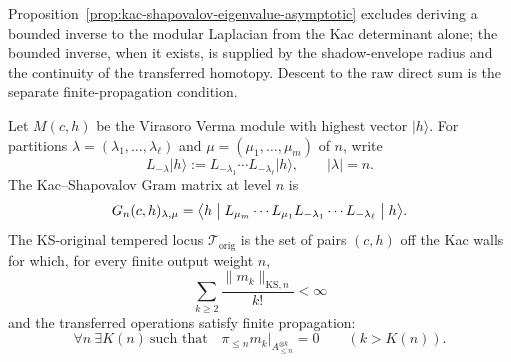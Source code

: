 \begin{remark}
\label{rem:why-no-naive-geometric-series}
Proposition~\ref{prop:kac-shapovalov-eigenvalue-asymptotic} excludes
deriving a bounded inverse to the modular Laplacian from the Kac
determinant alone; the bounded inverse, when it exists, is supplied by
the shadow-envelope radius and the continuity of the transferred
homotopy. Descent to the raw direct sum is the separate
finite-propagation condition.
\end{remark}

\begin{definition}
\label{def:virasoro-ks-original-tempered-locus}
Let \(M(c,h)\) be the Virasoro Verma module with highest vector
\(\lvert h\rangle\). For partitions
\(\lambda=(\lambda_1,\ldots,\lambda_\ell)\) and
\(\mu=(\mu_1,\ldots,\mu_m)\) of \(n\), write
\[
 L_{-\lambda}\lvert h\rangle
 :=
 L_{-\lambda_1}\cdots L_{-\lambda_\ell}\lvert h\rangle,
 \qquad |\lambda|=n.
\]
The Kac--Shapovalov Gram matrix at level \(n\) is
\begin{equation}
\label{eq:virasoro-ks-gram-matrix}
G_n(c,h)_{\lambda,\mu}
 =
\bigl\langle h\bigm|
L_{\mu_m}\cdots L_{\mu_1}
L_{-\lambda_1}\cdots L_{-\lambda_\ell}
\bigm|h\bigr\rangle.
\end{equation}
The KS-original tempered locus
\(\mathcal T_{\mathrm{orig}}\) is the set of pairs \((c,h)\) off the
Kac walls for which, for every finite output weight \(n\),
\begin{equation}
\label{eq:virasoro-ks-original-summability}
\sum_{k\ge2}\frac{\|m_k\|_{\mathrm{KS},n}}{k!}<\infty
\end{equation}
and the transferred operations satisfy finite propagation:
\begin{equation}
\label{eq:virasoro-ks-finite-propagation}
\forall n\ \exists K(n)\ \text{such that}\quad
\pi_{\le n}m_k\big|_{A_{\le n}^{\otimes k}}=0
\qquad (k>K(n)).
\end{equation}
\end{definition}

